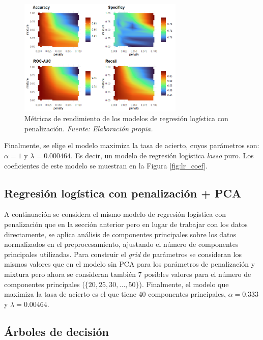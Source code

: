 \documentclass[12pt,a4paper,]{book}
\numberwithin{dummy}{section}
\theoremstyle{ocrenumbox}
\theoremstyle{blacknumex}
\theoremstyle{blacknumbox}
\theoremstyle{ocrenum}
\theoremstyle{ocrenum}
\begin{document}
\begin{figure}[h!]
\centering
\includegraphics[width =0.7\textwidth]{graficos/lr_tuningplot.png}
\caption{Métricas de rendimiento de los modelos de regresión logística con penalización.  \it Fuente: Elaboración propia.}
\label{fig:lr_tuningplot}
\end{figure}

Finalmente, se elige el modelo maximiza la tasa de acierto, cuyos
parámetros son: \(\alpha= 1\) y \(\lambda = 0.000464\). Es decir, un
modelo de regresión logística \emph{lasso} puro. Los coeficientes de
este modelo se muestran en la Figura \ref{fig:lr_coef}.

\hypertarget{regresiuxf3n-loguxedstica-con-penalizaciuxf3n-pca}{%
\subsection{Regresión logística con penalización +
PCA}\label{regresiuxf3n-loguxedstica-con-penalizaciuxf3n-pca}}

A continuación se considera el mismo modelo de regresión logística con
penalización que en la sección anterior pero en lugar de trabajar con
los datos directamente, se aplica análisis de componentes principales
sobre los datos normalizados en el preprocesamiento, ajustando el número
de componentes principales utilizadas. Para construir el \emph{grid} de
parámetros se consideran los mismos valores que en el modelo sin PCA
para los parámetros de penalización y mixtura pero ahora se consideran
también 7 posibles valores para el número de componentes principales
(\(\{20,25,30,...,50\}\)). Finalmente, el modelo que maximiza la tasa de
acierto es el que tiene 40 componentes principales, \(\alpha= 0.333\) y
\(\lambda = 0.00464\).

\hypertarget{uxe1rboles-de-decisiuxf3n}{%
\subsection{Árboles de decisión}\label{uxe1rboles-de-decisiuxf3n}}
\end{document}
